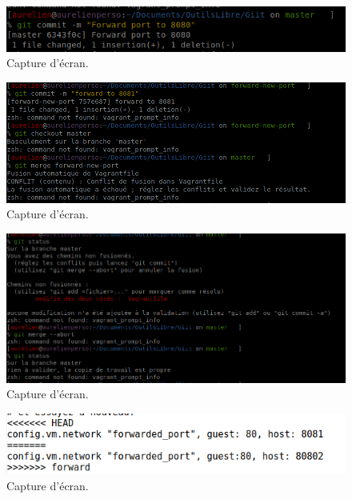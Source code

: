 \documentclass{article}
\begin{document}
\begin{figure}[h]
\centering
\includegraphics[width=0.7\columnwidth]{screen/git3_1.png}
\caption{\label{fig:frog}Capture d'écran.}
\end{figure}

\begin{figure}[h]
\centering
\includegraphics[width=0.7\columnwidth]{screen/git3_2.png}
\caption{\label{fig:frog}Capture d'écran.}
\end{figure}

\begin{figure}[h]
\centering
\includegraphics[width=0.7\columnwidth]{screen/git3_3.png}
\caption{\label{fig:frog}Capture d'écran.}
\end{figure}

\begin{figure}[h]
\centering
\includegraphics[width=0.7\columnwidth]{screen/git3_4.png}
\caption{\label{fig:frog}Capture d'écran.}
\end{figure}
\end{document}
